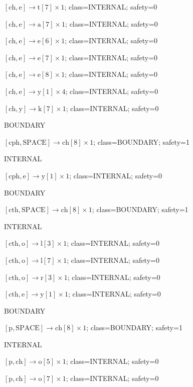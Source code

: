 \(\left[\mathrm{ch}, \mathrm{e}\right] \to \mathrm{t}[7] \times 1\); class=INTERNAL; safety=0\par
\(\left[\mathrm{ch}, \mathrm{e}\right] \to \mathrm{a}[7] \times 1\); class=INTERNAL; safety=0\par
\(\left[\mathrm{ch}, \mathrm{e}\right] \to \mathrm{e}[6] \times 1\); class=INTERNAL; safety=0\par
\(\left[\mathrm{ch}, \mathrm{e}\right] \to \mathrm{e}[7] \times 1\); class=INTERNAL; safety=0\par
\(\left[\mathrm{ch}, \mathrm{e}\right] \to \mathrm{e}[8] \times 1\); class=INTERNAL; safety=0\par
\(\left[\mathrm{ch}, \mathrm{e}\right] \to \mathrm{y}[1] \times 4\); class=INTERNAL; safety=0\par
\(\left[\mathrm{ch}, \mathrm{y}\right] \to \mathrm{k}[7] \times 1\); class=INTERNAL; safety=0\par
BOUNDARY\par
\(\left[\mathrm{cph}, \mathrm{SPACE}\right] \to \mathrm{ch}[8] \times 1\); class=BOUNDARY; safety=1\par
INTERNAL\par
\(\left[\mathrm{cph}, \mathrm{e}\right] \to \mathrm{y}[1] \times 1\); class=INTERNAL; safety=0\par
BOUNDARY\par
\(\left[\mathrm{cth}, \mathrm{SPACE}\right] \to \mathrm{ch}[8] \times 1\); class=BOUNDARY; safety=1\par
INTERNAL\par
\(\left[\mathrm{cth}, \mathrm{o}\right] \to \mathrm{l}[3] \times 1\); class=INTERNAL; safety=0\par
\(\left[\mathrm{cth}, \mathrm{o}\right] \to \mathrm{l}[7] \times 1\); class=INTERNAL; safety=0\par
\(\left[\mathrm{cth}, \mathrm{o}\right] \to \mathrm{r}[3] \times 1\); class=INTERNAL; safety=0\par
\(\left[\mathrm{cth}, \mathrm{e}\right] \to \mathrm{y}[1] \times 1\); class=INTERNAL; safety=0\par
BOUNDARY\par
\(\left[\mathrm{p}, \mathrm{SPACE}\right] \to \mathrm{ch}[8] \times 1\); class=BOUNDARY; safety=1\par
INTERNAL\par
\(\left[\mathrm{p}, \mathrm{ch}\right] \to \mathrm{o}[5] \times 1\); class=INTERNAL; safety=0\par
\(\left[\mathrm{p}, \mathrm{ch}\right] \to \mathrm{o}[7] \times 1\); class=INTERNAL; safety=0\par

